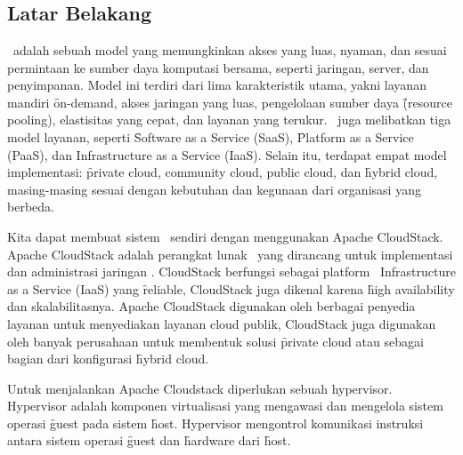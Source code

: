 \chapter{\babSatu}


\section{Latar Belakang}
\hspace{0.5cm} \cc\ adalah sebuah model yang memungkinkan akses yang luas, nyaman, dan sesuai permintaan ke sumber daya komputasi bersama, seperti jaringan, server, dan penyimpanan. Model ini terdiri dari lima karakteristik utama, yakni layanan mandiri \f{on-demand}, akses jaringan yang luas, pengelolaan sumber daya \f{(resource pooling)}, elastisitas yang cepat, dan layanan yang terukur. \cc\ juga melibatkan tiga model layanan, seperti \f{Software as a Service} (SaaS), \f{Platform as a Service} (PaaS), dan Infrastructure as a Service (IaaS). Selain itu, terdapat empat model implementasi: \f{private cloud, community cloud, public cloud,} dan \f{hybrid cloud,} masing-masing sesuai dengan kebutuhan dan kegunaan dari organisasi yang berbeda\cite{mell2009nist}.

Kita dapat membuat sistem \cc\ sendiri dengan menggunakan Apache CloudStack. Apache CloudStack adalah perangkat lunak \oss\ yang dirancang untuk implementasi dan administrasi jaringan \vm. CloudStack berfungsi sebagai platform \cc\ Infrastructure as a Service (IaaS) yang \f{reliable}, CloudStack juga dikenal karena \f{high availability} dan skalabilitasnya. Apache CloudStack digunakan oleh berbagai penyedia layanan untuk menyediakan layanan cloud publik, CloudStack juga digunakan oleh banyak perusahaan untuk membentuk solusi \f{private cloud} atau sebagai bagian dari konfigurasi \f{hybrid cloud}\cite{cloudstackabout}.

Untuk menjalankan Apache Cloudstack diperlukan sebuah hypervisor. Hypervisor adalah komponen virtualisasi yang mengawasi dan mengelola sistem operasi \f{guest} pada sistem \f{host}\cite{scarfone2009nist}. Hypervisor mengontrol komunikasi instruksi antara sistem operasi \f{guest} dan \f{hardware} dari \f{host}\cite{scarfone2009nist}.

